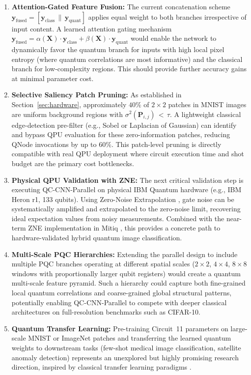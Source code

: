 \documentclass[pdflatex,sn-mathphys-num]{sn-jnl}%
\theoremstyle{thmstyleone}%
\theoremstyle{thmstyletwo}%
\theoremstyle{thmstylethree}%
\begin{document}
\begin{enumerate}
    \item \textbf{Attention-Gated Feature Fusion:} The current concatenation scheme $\mathbf{y}_{\mathrm{fused}} = [\mathbf{y}_{\mathrm{class}} \,\|\, \mathbf{y}_{\mathrm{quant}}]$ applies equal weight to both branches irrespective of input content. A learned attention gating mechanism $\mathbf{y}_{\mathrm{fused}} = \alpha(\mathbf{X}) \cdot \mathbf{y}_{\mathrm{class}} + \beta(\mathbf{X}) \cdot \mathbf{y}_{\mathrm{quant}}$ would enable the network to dynamically favor the quantum branch for inputs with high local pixel entropy (where quantum correlations are most informative) and the classical branch for low-complexity regions. This should provide further accuracy gains at minimal parameter cost.

    \item \textbf{Selective Saliency Patch Pruning:} As established in Section~\ref{sec:hardware}, approximately $40\%$ of $2 \times 2$ patches in MNIST images are uniform background regions with $\sigma^2(\mathbf{P}_{i,j}) \,{<}\, \tau$. A lightweight classical edge-detection pre-filter (e.g., Sobel or Laplacian of Gaussian) can identify and bypass QPU evaluation for these zero-information patches, reducing QNode invocations by up to $60\%$. This patch-level pruning is directly compatible with real QPU deployment where circuit execution time and shot budget are the primary cost bottlenecks.

    \item \textbf{Physical QPU Validation with ZNE:} The next critical validation step is executing QC-CNN-Parallel on physical IBM Quantum hardware (e.g., IBM Heron r1, 133 qubits). Using Zero-Noise Extrapolation \cite{temme2017error, koczor2021exponential}, gate noise can be systematically amplified and extrapolated to the zero-noise limit, recovering ideal expectation values from noisy measurements. Combined with the near-term ZNE implementation in Mitiq \cite{cai2023quantum}, this provides a concrete path to hardware-validated hybrid quantum image classification.

    \item \textbf{Multi-Scale PQC Hierarchies:} Extending the parallel design to include multiple PQC branches operating at different spatial scales ($2 \times 2$, $4 \times 4$, $8 \times 8$ windows with proportionally larger qubit registers) would create a quantum multi-scale feature pyramid. Such a hierarchy could capture both fine-grained local quantum correlations and coarse-grained global structural patterns, potentially enabling QC-CNN-Parallel to compete with deeper classical architectures on full-resolution benchmarks such as CIFAR-10.

    \item \textbf{Quantum Transfer Learning:} Pre-training Circuit~11 parameters on large-scale MNIST or ImageNet patches and transferring the learned quantum weights to downstream tasks (few-shot medical image classification, satellite anomaly detection) represents an unexplored but highly promising research direction, inspired by classical transfer learning paradigms \cite{biamonte2017quantum, dunjko2018machine}.
\end{enumerate}
\end{document}
